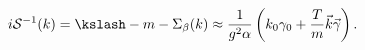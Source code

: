 \begin{equation}
\label{eq:prop_ll}
 i \mathcal{S}^{-1}(k)=\kslash-m-\Sigma_\beta(k)\approx
\frac{1}{g^2\alpha}
\left(k_0\gamma_0+\frac{T}{m}\vec k\vec\gamma\right).
\end{equation}

